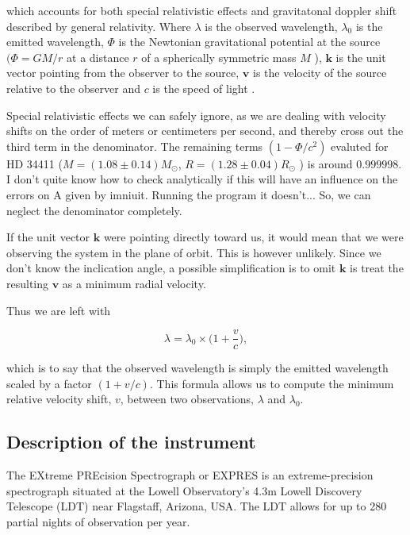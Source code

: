 which accounts for both special relativistic effects and gravitatonal doppler shift described by general relativity. Where $\lambda$ is the observed wavelength, $\lambda_0$ is the emitted wavelength, $\Phi$ is the Newtonian gravitational potential at the source $(\Phi=G M / r$ at a distance $r$ of a spherically symmetric mass $M$ ), $\textbf{k}$ is the unit vector pointing from the observer to the source, $\textbf{v}$ is the velocity of the source relative to the observer and $c$ is the speed of light \cite{doppler_shift_GR_formula}.

Special relativistic effects we can safely ignore, as we are dealing with velocity shifts on the order of meters or centimeters per second, and thereby cross out the third term in the denominator. The remaining terms $(1-\Phi/c^2)$ evaluted for HD 34411 ($M = (1.08 \pm 0.14) M_{\odot}$, $R = (1.28 \pm 0.04) R_{\odot}$ \cite{star_properties}) is around $0.999998$. \todo{}I don't quite know how to check analytically if this will have an influence on the errors on A given by imniuit. Running the program it doesn't... So, we can neglect the denominator completely.

If the unit vector $\textbf{k}$ were pointing directly toward us, it would mean that we were observing the system in the plane of orbit. This is however unlikely. Since we don't know the inclication angle, a possible simplification is to omit $\textbf{k}$ is treat the resulting $\textbf{v}$ as a minimum radial velocity.

Thus we are left with 

\begin{equation}
    \label{eq:our_doppler}
    \lambda = \lambda_0 \times \Big(1 + \frac{v}{c} \Big),
\end{equation}

which is to say that the observed wavelength is simply the emitted wavelength scaled by a factor $(1 + v/c)$. This formula allows us to compute the minimum relative velocity shift, $v$, between two observations, $\lambda$ and $\lambda_0$.


\subsection{Description of the instrument}
The EXtreme PREcision Spectrograph or EXPRES is an extreme-precision spectrograph situated at the Lowell Observatory's 4.3m Lowell Discovery Telescope (LDT) near Flagstaff, Arizona, USA. The LDT allows for up to 280 partial nights of observation per year.

